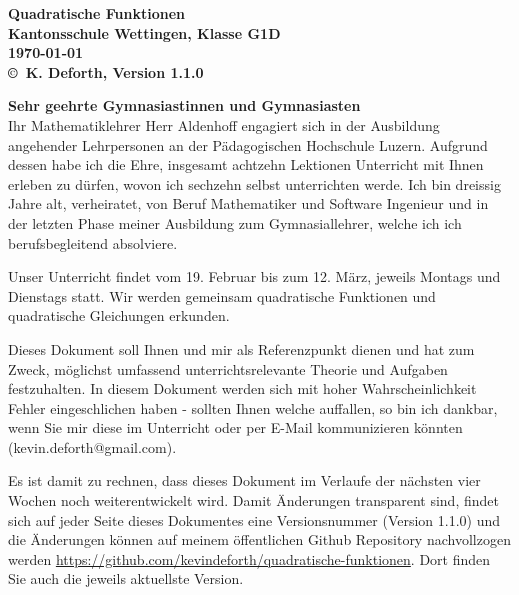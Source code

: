 \documentclass[12pt]{article}
\newcommand{\docName}{Quadratische Funktionen}
\newcommand{\docVersion}{Version 1.1.0}
\newcommand{\klasse}{Kantonsschule Wettingen, Klasse G1D}
\begin{document}
\begingroup %
\centering %
\LARGE\bfseries %
\docName{} \\[1em] %
\normalsize
\klasse \\[0.5em]
\today\\[0.5em]
\mdseries\normalsize
\copyright~K. Deforth, \docVersion{}\\[2em] %
\endgroup

\thispagestyle{empty}

\noindent%
\textbf{Sehr geehrte Gymnasiastinnen und Gymnasiasten}\\

Ihr Mathematiklehrer Herr Aldenhoff engagiert sich in der Ausbildung angehender Lehrpersonen an der Pädagogischen Hochschule Luzern. Aufgrund dessen habe ich die Ehre, insgesamt achtzehn Lektionen Unterricht mit Ihnen erleben zu dürfen, wovon ich sechzehn selbst unterrichten werde. Ich bin dreissig Jahre alt, verheiratet, von Beruf Mathematiker und Software Ingenieur und in der letzten Phase meiner Ausbildung zum Gymnasiallehrer, welche ich ich berufsbegleitend absolviere.

Unser Unterricht findet vom 19. Februar bis zum 12. März, jeweils Montags und Dienstags statt. Wir werden gemeinsam quadratische Funktionen und quadratische Gleichungen erkunden.

Dieses Dokument soll Ihnen und mir als Referenzpunkt dienen und hat zum Zweck, möglichst umfassend unterrichtsrelevante Theorie und Aufgaben festzuhalten. In diesem Dokument werden sich mit hoher Wahrscheinlichkeit Fehler eingeschlichen haben - sollten Ihnen welche auffallen, so bin ich dankbar, wenn Sie mir diese im Unterricht oder per E-Mail kommunizieren könnten ({kevin.deforth@gmail.com}). 

Es ist damit zu rechnen, dass dieses Dokument im Verlaufe der nächsten vier Wochen noch weiterentwickelt wird. Damit Änderungen transparent sind, findet sich auf jeder Seite dieses Dokumentes eine Versionsnummer (\docVersion) und die Änderungen können auf meinem öffentlichen Github Repository nachvollzogen werden \href{https://github.com/kevindeforth/quadratische-funktionen}{https://github.com/kevindeforth/quadratische-funktionen}. Dort finden Sie auch die jeweils aktuellste Version.
\end{document}
